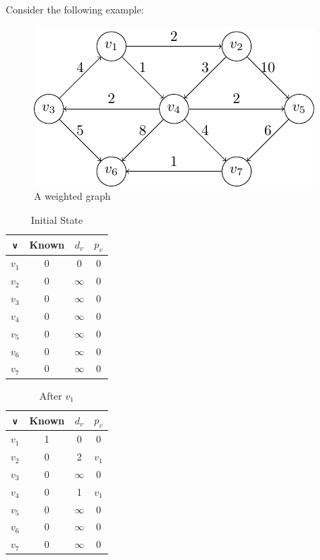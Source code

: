 Consider the following example:

\begin{minipage}{0.33\textwidth}
  \begin{figure}[H]
    \centering
    \includegraphics[width=\textwidth]{Figure/shortest_path_algo.pdf}
    \caption{A weighted graph}
  \end{figure}
\end{minipage}\quad\quad
\begin{minipage}{0.33\textwidth}
\begin{table}[H]
  \centering
  \begin{tabular}{c|c|c|c}
      \toprule
      \verb|v| & Known & \(d_v\) & \(p_v\)  \\
    \midrule
      \(v_1\) & 0 & 0 & 0  \\
      \(v_2\) & 0 & \(\infty\) & 0  \\
      \(v_3\) & 0 & \(\infty\) & 0  \\
      \(v_4\) & 0 & \(\infty\) & 0  \\
      \(v_5\) & 0 & \(\infty\) & 0  \\
      \(v_6\) & 0 & \(\infty\) & 0  \\
      \(v_7\) & 0 & \(\infty\) & 0  \\
    \bottomrule
  \end{tabular}
  \caption*{Initial State}
\end{table}
\end{minipage}
\begin{minipage}{0.33\textwidth}
\begin{table}[H]
  \centering
  \begin{tabular}{c|c|c|c}
      \toprule
      \verb|v| & Known & \(d_v\) & \(p_v\)  \\
    \midrule
      \(v_1\) & 1 & 0 & 0  \\
      \(v_2\) & 0 & 2 & \(v_1\)  \\
      \(v_3\) & 0 & \(\infty\) & 0  \\
      \(v_4\) & 0 & 1 & \(v_1\)  \\
      \(v_5\) & 0 & \(\infty\) & 0  \\
      \(v_6\) & 0 & \(\infty\) & 0  \\
      \(v_7\) & 0 & \(\infty\) & 0  \\
    \bottomrule
  \end{tabular}
  \caption*{After \(v_1\)}
\end{table}
\end{minipage}

